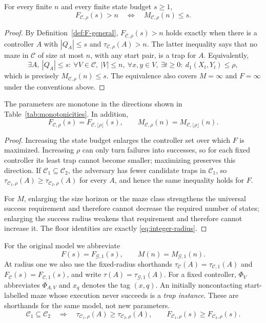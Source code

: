\begin{theorem}[$F/M$ duality]\label{thm:FM-duality}
For every finite $n$ and every finite state budget $s\ge1$,
\[
 \boxed{F_{\mathcal C,\rho}(s)>n
 \quad\Longleftrightarrow\quad
 M_{\mathcal C,\rho}(n)\le s.}
\]
\end{theorem}
\begin{proof}
By Definition~\ref{def:F-general}, $F_{\mathcal C,\rho}(s)>n$ holds exactly when there is a controller $A$ with $|Q_A|\le s$ and $\tau_{\mathcal C,\rho}(A)>n$.  The latter inequality says that no maze in $\mathcal C$ of size at most $n$, with any start pair, is a trap for $A$.  Equivalently,
\[
 \exists A,\ |Q_A|\le s:\ \forall V\in\mathcal C,\ |V|\le n,\ 
 \forall x,y\in V,\ \exists t\ge0:\ d_1(X_t,Y_t)\le\rho,
\]
which is precisely $M_{\mathcal C,\rho}(n)\le s$.  The equivalence also covers $M=\infty$ and $F=\infty$ under the conventions above.
\end{proof}

\begin{proposition}[Monotonicities]\label{prop:general-monotonicities}
The parameters are monotone in the directions shown in Table~\ref{tab:monotonicities}.  In addition,
\[
 F_{\mathcal C,\rho}(s)=F_{\mathcal C,\lfloor\rho\rfloor}(s),
 \qquad
 M_{\mathcal C,\rho}(n)=M_{\mathcal C,\lfloor\rho\rfloor}(n).
\]
\end{proposition}
\begin{proof}
Increasing the state budget enlarges the controller set over which $F$ is maximized.  Increasing $\rho$ can only turn failures into successes, so for each fixed controller its least trap cannot become smaller; maximizing preserves this direction.  If $\mathcal C_1\subseteq\mathcal C_2$, the adversary has fewer candidate traps in $\mathcal C_1$, so $\tau_{\mathcal C_1,\rho}(A)\ge\tau_{\mathcal C_2,\rho}(A)$ for every $A$, and hence the same inequality holds for $F$.

For $M$, enlarging the size horizon or the maze class strengthens the universal success requirement and therefore cannot decrease the required number of states; enlarging the success radius weakens that requirement and therefore cannot increase it.  The floor identities are exactly \eqref{eq:integer-radius}.
\end{proof}



For the original model we abbreviate
\[
 F(s)=F_{\mathcal G,1}(s),\qquad M(n)=M_{\mathcal G,1}(n).
\]
At radius one we also use the fixed-radius shorthands
$\tau_{\mathcal C}(A)=\tau_{\mathcal C,1}(A)$ and
$F_{\mathcal C}(s)=F_{\mathcal C,1}(s)$, and write $\tau(A)=\tau_{\mathcal G,1}(A)$.
For a fixed controller, $\Phi_V$ abbreviates $\Phi_{A,V}$ and $x_q$ denotes the tag $(x,q)$.
An initially noncontacting start-labelled maze whose execution never succeeds is a
\emph{trap instance}. These are shorthands for the same model, not new parameters.
\begin{equation}\label{eq:class-monotonicity}
\mathcal C_1\subseteq\mathcal C_2\quad\Longrightarrow\quad
\tau_{\mathcal C_1,\rho}(A)\ge\tau_{\mathcal C_2,\rho}(A),\qquad
F_{\mathcal C_1,\rho}(s)\ge F_{\mathcal C_2,\rho}(s).
\end{equation}

